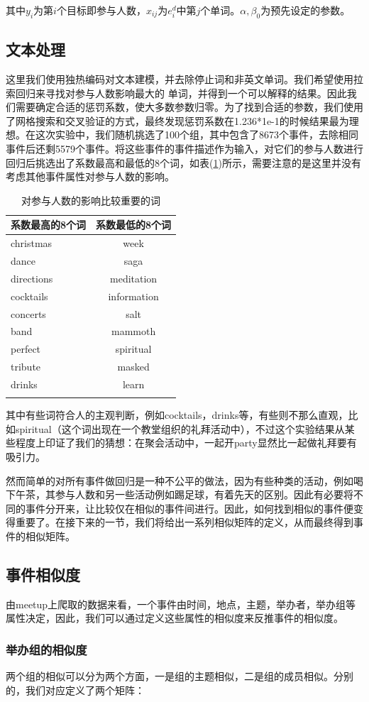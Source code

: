 其中\(y_i\)为第\(i\)个目标即参与人数，\(x_{ij}\)为\(e_i^d\)中第\(j\)个单词。\(\alpha,\beta_0\)为预先设定的参数。
\subsection{文本处理}\label{3.2}

这里我们使用独热编码对文本建模，并去除停止词和非英文单词。我们希望使用拉索回归来寻找对参与人数影响最大的
单词，并得到一个可以解释的结果。因此我们需要确定合适的惩罚系数，使大多数参数归零。为了找到合适的参数，我们使用了网格搜索和交叉验证的方式，最终发现惩罚系数在1.236*1e-1的时候结果最为理想。在这次实验中，我们随机挑选了100个组，其中包含了8673个事件，去除相同事件后还剩5579个事件。将这些事件的事件描述作为输入，对它们的参与人数进行回归后挑选出了系数最高和最低的8个词，如表(\ref{t2})所示，需要注意的是这里并没有考虑其他事件属性对参与人数的影响。

\begin{longtable}[HTBP]{@{}lc@{}}
\toprule
系数最高的8个词 & 系数最低的8个词\tabularnewline
\midrule
\endhead
christmas & week\tabularnewline
dance & saga\tabularnewline
directions & meditation\tabularnewline
cocktails & information\tabularnewline
concerts & salt\tabularnewline
band & mammoth\tabularnewline
perfect & spiritual\tabularnewline
tribute & masked\tabularnewline
drinks & learn\tabularnewline
\bottomrule
\label{t2}
\caption{对参与人数的影响比较重要的词}
\end{longtable}
  
其中有些词符合人的主观判断，例如cocktails，drinks等，有些则不那么直观，比如spiritual（这个词出现在一个教堂组织的礼拜活动中），不过这个实验结果从某些程度上印证了我们的猜想：在聚会活动中，一起开party显然比一起做礼拜要有吸引力。

然而简单的对所有事件做回归是一种不公平的做法，因为有些种类的活动，例如喝下午茶，其参与人数和另一些活动例如踢足球，有着先天的区别。因此有必要将不同的事件分开来，让比较仅在相似的事件间进行。因此，如何找到相似的事件便变得重要了。在接下来的一节，我们将给出一系列相似矩阵的定义，从而最终得到事件的相似矩阵。

\subsection{事件相似度}
由meetup上爬取的数据来看，一个事件由时间，地点，主题，举办者，举办组等属性决定，因此，我们可以通过定义这些属性的相似度来反推事件的相似度。

\subsubsection{举办组的相似度}
两个组的相似可以分为两个方面，一是组的主题相似，二是组的成员相似。分别的，我们对应定义了两个矩阵：

